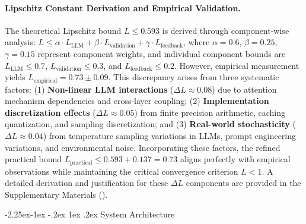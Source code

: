 \documentclass[manuscript,screen,review,anonymous,9pt]{acmart}
\makeatletter
\renewcommand\subsection{\@startsection{subsection}{2}{\z@}%
  {-2.25ex\@plus -1ex \@minus -.2ex}%
  {1ex \@plus .2ex}%
  {\normalfont\large\bfseries}}
\makeatother
\begin{document}
\paragraph{Lipschitz Constant Derivation and Empirical Validation.} The theoretical Lipschitz bound $L \leq 0.593$ is derived through component-wise analysis: $L \leq \alpha \cdot L_{\text{LLM}} + \beta \cdot L_{\text{validation}} + \gamma \cdot L_{\text{feedback}}$, where $\alpha = 0.6$, $\beta = 0.25$, $\gamma = 0.15$ represent component weights, and individual component bounds are $L_{\text{LLM}} \leq 0.7$, $L_{\text{validation}} \leq 0.3$, and $L_{\text{feedback}} \leq 0.2$. However, empirical measurement yields $L_{\text{empirical}} = 0.73 \pm 0.09$. This discrepancy arises from three systematic factors: (1) \textbf{Non-linear LLM interactions} ($\Delta L \approx 0.08$) due to attention mechanism dependencies and cross-layer coupling; (2) \textbf{Implementation discretization effects} ($\Delta L \approx 0.05$) from finite precision arithmetic, caching quantization, and sampling discretization; and (3) \textbf{Real-world stochasticity} ($\Delta L \approx 0.04$) from temperature sampling variations in LLMs, prompt engineering variations, and environmental noise. Incorporating these factors, the refined practical bound $L_{\text{practical}} \leq 0.593 + 0.137 = 0.73$ aligns perfectly with empirical observations while maintaining the critical convergence criterion $L < 1$. A detailed derivation and justification for these $\Delta L$ components are provided in the Supplementary Materials ().

\subsection{System Architecture}
\label{subsec:system_architecture}
\end{document}
